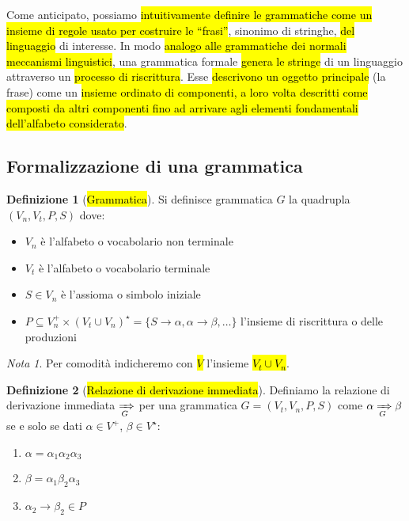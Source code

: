 \documentclass[a4paper,11pt,oneside]{article}
\theoremstyle{plain}
\theoremstyle{definition}
\newtheorem{defn}{Definizione}[section]
\theoremstyle{remark}
\newtheorem*{nota}{Nota}
\newcommand*{\deriv}[1][]{\xRightarrow[#1]{}}
\begin{document}
Come anticipato, possiamo \hl{intuitivamente definire le grammatiche come un
insieme di regole usato per costruire le ``frasi''}, sinonimo di stringhe,
\hl{del linguaggio} di interesse. In modo \hl{analogo alle grammatiche dei
normali meccanismi linguistici}, una grammatica formale \hl{genera le stringe}
di un linguaggio attraverso un \hl{processo di riscrittura}. Esse \hl{descrivono
un oggetto principale} (la frase) come un \hl{insieme ordinato di componenti, a
loro volta descritti come composti da altri componenti fino ad arrivare agli
elementi fondamentali dell'alfabeto considerato}.

\subsection{Formalizzazione di una grammatica}\label{sec:form-grammatica}

\begin{defn}[\hl{Grammatica}]\label{def:grammatica}
  Si definisce grammatica $G$ la quadrupla $(V_n, V_t, P, S)$ dove:

  \begin{itemize}
    \item $V_n$ è l'alfabeto o vocabolario non terminale
    \item $V_t$ è l'alfabeto o vocabolario terminale
    \item $S \in V_n$ è l'assioma o simbolo iniziale
    \item
      $P \subseteq V_n^+ \times {(V_t \cup V_n)}^\star =
      \{S \to \alpha, \alpha \to \beta, \ldots\}$ l'insieme di riscrittura o
      delle produzioni
  \end{itemize}
\end{defn}

\begin{nota}
  Per comodità indicheremo con \hl{$V$} l'insieme \hl{$V_t \cup V_n$}.
\end{nota}

\begin{defn}[\hl{Relazione di derivazione immediata}]\label{def:deriv}
  Definiamo la relazione di derivazione immediata $\deriv[G]$ per una grammatica
  $G = (V_t, V_n, P, S)$ come $\alpha \deriv[G] \beta$ se e solo se dati
  $\alpha \in V^+$, $\beta \in V^\star$:

  \begin{enumerate}
    \item $\alpha = \alpha_1 \alpha_2 \alpha_3$
    \item $\beta = \alpha_1 \beta_2 \alpha_3$
    \item $\alpha_2 \to \beta_2 \in P$
  \end{enumerate}
\end{defn}
\end{document}
